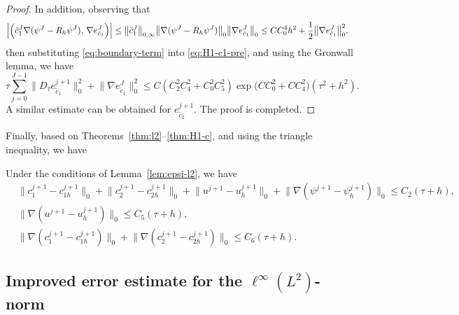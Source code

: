 \begin{proof}
In addition, observing that
\begin{align}
  \Bigl|\Bigl(\tilde{c}_{1}^{J}\nabla(\psi^{J} - R_{h}\psi^{J}),\,
              \nabla e_{\tilde{c}_{1}}^{J}\Bigr)\Bigr|
  &\leq \bigl\|\tilde{c}_{1}^{J}\bigr\|_{0,\infty}
         \bigl\|\nabla(\psi^{J} - R_{h}\psi^{J})\bigr\|_{0}
         \bigl\|\nabla e_{\tilde{c}_{1}}^{J}\bigr\|_{0}
  \leq CC_{0}^{4}h^{2} + \frac{1}{2}\bigl\|\nabla e_{\tilde{c}_{1}}^{J}\bigr\|_{0}^{2},
  \label{eq:boundary-term}
\end{align}
then substituting \eqref{eq:boundary-term} into \eqref{eq:H1-c1-pre}, and using the Gronwall
lemma, we have
\begin{equation}\label{eq:H1-c1-final}
  \tau\sum_{j=0}^{J-1}\bigl\|D_{\tau}e_{\tilde{c}_{1}}^{j+1}\bigr\|_{0}^{2}
  + \bigl\|\nabla e_{\tilde{c}_{1}}^{J}\bigr\|_{0}^{2}
  \leq C(C_{2}^{2}C_{4}^{2} + C_{0}^{2}C_{5}^{2})
       \exp\!\bigl(CC_{0}^{2} + CC_{4}^{2}\bigr)(\tau^{2}+h^{2}).
\end{equation}
A similar estimate can be obtained for $e_{\tilde{c}_{2}}^{j+1}$. The proof is completed.
\end{proof}

Finally, based on Theorems~\ref{thm:l2}--\ref{thm:H1-c}, and using the triangle inequality,
we have

\begin{theorem}\label{thm:H1-all}
Under the conditions of Lemma~\ref{lem:epsi-l2}, we have
\begin{align}
  &\bigl\|c_{1}^{j+1} - c_{1h}^{j+1}\bigr\|_{0}
   + \bigl\|c_{2}^{j+1} - c_{2h}^{j+1}\bigr\|_{0}
   + \bigl\|u^{j+1} - u_{h}^{j+1}\bigr\|_{0}
   + \bigl\|\nabla(\psi^{j+1} - \psi_{h}^{j+1})\bigr\|_{0}
   \leq C_{2}(\tau + h),
  \label{eq:final-L2}\\[4pt]
  &\bigl\|\nabla(u^{j+1} - u_{h}^{j+1})\bigr\|_{0}
   \leq C_{5}(\tau + h),
  \label{eq:final-H1-u}\\[4pt]
  &\bigl\|\nabla(c_{1}^{j+1} - c_{1h}^{j+1})\bigr\|_{0}
   + \bigl\|\nabla(c_{2}^{j+1} - c_{2h}^{j+1})\bigr\|_{0}
   \leq C_{6}(\tau + h).
  \label{eq:final-H1-c}
\end{align}
\end{theorem}

\subsection{Improved error estimate for the
  \texorpdfstring{$\ell^{\infty}(L^{2})$}{l-inf(L2)}-norm}

